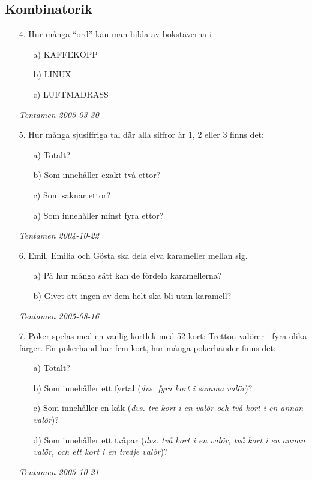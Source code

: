 \documentclass{article}
\begin{document}
\subsection*{Kombinatorik}
\begin{enumerate}

\item[4.]
Hur många ``ord'' kan man bilda av bokstäverna i
\begin{itemize}
    \item[a) ] KAFFEKOPP
    \item[b) ] LINUX
    \item[c) ] LUFTMADRASS
\end{itemize}
{\it Tentamen 2005-03-30}

\item[5.]
Hur många sjusiffriga tal där alla siffror är 1, 2 eller 3 finns det:
\begin{itemize}
    \item[a) ] Totalt?
    \item[b) ] Som innehåller exakt två ettor?
    \item[c) ] Som saknar ettor?
    \item[a) ] Som innehåller minst fyra ettor?
\end{itemize}
{\it Tentamen 2004-10-22}\\

\item[6.]
Emil, Emilia och Gösta ska dela elva karameller mellan sig. 
\begin{itemize}
    \item[a) ] På hur många sätt kan de fördela karamellerna?
    \item[b) ] Givet att ingen av dem helt ska bli utan karamell?
\end{itemize}
{\it Tentamen 2005-08-16}

\item[7.]
Poker spelas med en vanlig kortlek med 52 kort: Tretton valörer i fyra olika färger.
En pokerhand har fem kort, hur många pokerhänder finns det:
\begin{itemize}
    \item[a) ] Totalt?
    \item[b) ] Som innehåller ett fyrtal ({\it dvs. fyra kort i samma valör})?
    \item[c) ] Som innehåller en kåk ({\it dvs. tre kort i en valör och två 
               kort i en annan valör})?
    \item[d) ] Som innehåller ett tvåpar ({\it dvs. två kort i en valör, 
               två kort i en annan valör, och ett kort i en tredje valör})?
\end{itemize}
{\it Tentamen 2005-10-21}
\end{enumerate}
\end{document}
